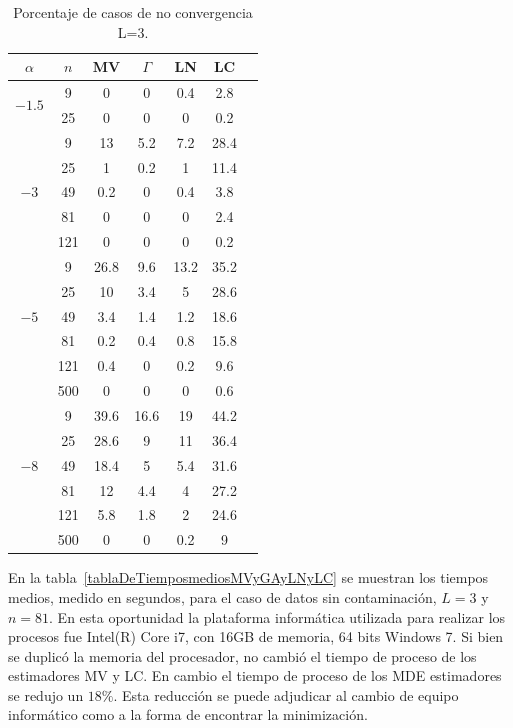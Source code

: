 \begin{table}[hbt]
	\caption{Porcentaje de casos de no convergencia  L=$3$.}
	\centering
	\label{NoConvMLyNGyLNyLC_L=3}
	\begin{tabular}{c*6{S}}
			\toprule		
			$\alpha$ & $n$ & MV & $\Gamma$ & LN &  LC\\
			\midrule
			&   9 &  0  &  0  &  0.4  &   2.8 \\
			&   25  &  0  &  0  &  0  &  0.2 \\
			\midrule
			&    9  &  13     &  5.2   &  7.2   &   28.4 \\ 
			&   25  &  1      &  0.2   &  1     &   11.4 \\
			&   49  &  0.2    &  0     &  0.4   &  3.8 \\ 
			&   81  &  0      &  0     &  0     &  2.4 \\ 
			&  121  &  0      &  0     &  0     &  0.2 \\ 
			\midrule
			&    9  &  26.8   &  9.6   &  13.2  &   35.2 \\ 
			&   25  &  10     &  3.4   &  5     &  28.6 \\ 
			&   49  &  3.4    &  1.4   &  1.2   &  18.6 \\ 
			&   81  &  0.2    &  0.4   &  0.8   &  15.8 \\ 
			&  121  &  0.4    &  0     &  0.2   &  9.6 \\ 
			&  500  &  0      &  0     &  0     &  0.6 \\ 
			\midrule
			&    9   &  39.6  &  16.6  &  19    &  44.2 \\ 
			&   25   &  28.6  &  9     &  11    &  36.4 \\ 
			&   49   &  18.4  &  5     &  5.4   &  31.6 \\ 
			&   81   &  12    &  4.4   &  4     &  27.2 \\ 
			&  121   &  5.8   &  1.8   &  2     &  24.6 \\ 
			&  500   &  0     &  0     &  0.2   &  9 \\
			\bottomrule 	
		\end{tabular}
\end{table}	

En la tabla~\ref{tablaDeTiemposmediosMVyGAyLNyLC} se muestran los tiempos medios, medido en segundos, para el caso de datos sin contaminación, $L=3$ y $n=81$. En esta oportunidad la plataforma informática utilizada para realizar los procesos fue Intel(R) Core i7, con 16GB de memoria, 64 bits Windows 7. Si bien se duplicó la memoria del procesador, no cambió el tiempo de proceso de los estimadores MV y LC. En cambio el tiempo de proceso de los MDE estimadores se redujo un $18\%$. Esta reducción se puede adjudicar al cambio de equipo informático como a la forma de encontrar la minimización.

